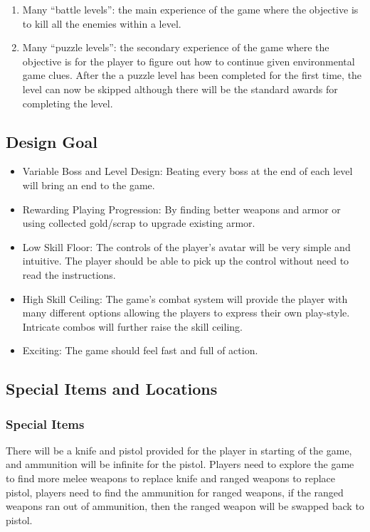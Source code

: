 \documentclass{article}
\begin{document}
\begin{enumerate}
        \item  Many “battle levels”: the main experience of the game where the objective is to kill all the enemies within a level. 
        \item Many “puzzle levels”: the secondary experience of the game where the objective is for the player to figure out how to continue given environmental game clues. After the a puzzle level  has been completed for the first time, the level can now be skipped although there will be the standard awards for completing the level. 
    \end{enumerate}
    


\subsection*{Design Goal}
    \begin{itemize}
        \item Variable Boss and Level Design: Beating every boss at the end of each level will bring an end to the game.
        \item Rewarding Playing Progression: By finding better weapons and armor or using collected gold/scrap to upgrade existing armor. 
        \item Low Skill Floor: The controls of the player’s avatar will be very simple and intuitive. The player should be able to pick up the control without need to read the instructions.
        \item High Skill Ceiling: The game's combat system will provide the player with many different options allowing the players to express their own play-style. Intricate combos will further raise the skill ceiling.
        \item Exciting: The game should feel fast and full of action.
    \end{itemize}


\subsection*{Special Items and Locations}
    \subsubsection*{Special Items}
    There will be a knife and pistol provided for the player in starting of the game, and ammunition will be infinite for the pistol. Players need to explore the game to find more melee weapons to replace knife and ranged weapons to replace pistol, players need to find the ammunition for ranged weapons, if the ranged weapons ran out of ammunition, then the ranged weapon will be swapped back to pistol.
\end{document}
